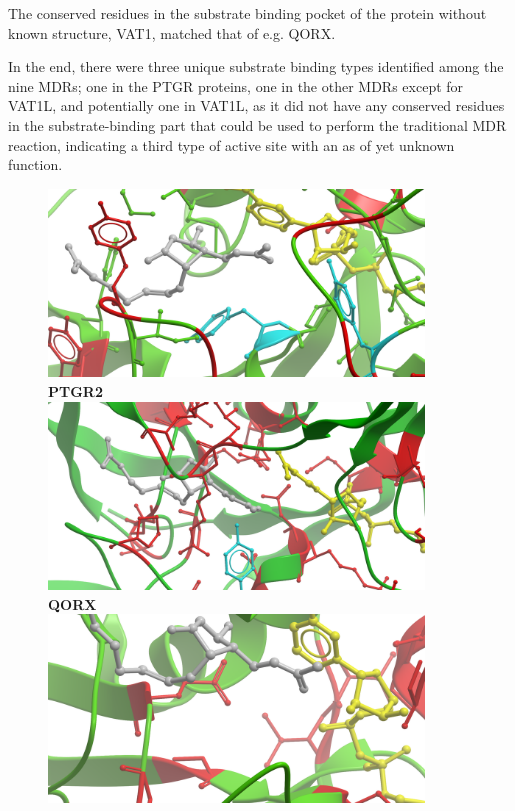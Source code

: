 \documentclass[a4paper, twoside, 12pt, openright]{report}
\begin{document}
The conserved residues in the substrate binding pocket of the protein without known structure, VAT1, matched that of e.g. QORX.

In the end, there were three unique substrate binding types identified among the nine MDRs; one in the PTGR proteins, one in the other MDRs except for VAT1L, and potentially one in VAT1L, as it did not have any conserved residues in the substrate-binding part that could be used to perform the traditional MDR reaction, indicating a third type of active site with an as of yet unknown function.

\begin{figure}[htbp]
 \includegraphics[width=0.89\textwidth]{fig/ptgr2_substrate.png}\\
 {\bf PTGR2}\\
 \vspace{10pt}
 \includegraphics[width=0.89\textwidth]{fig/qorx_substrate.png}\\
 {\bf QORX}\\
 \vspace{10pt}
 \includegraphics[width=0.89\textwidth]{fig/vat1l_substrate.png}\\

\end{figure}
\end{document}
